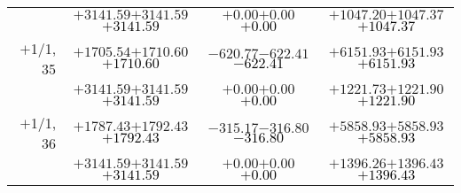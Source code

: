 \documentclass[compress]{beamer}
\begin{document}
\begin{frame}
{\begin{tabular}{r | c | c | c}
           & $+3141.59$\hspace{0.1 cm}$+3141.59$\hspace{0.1 cm}\textcolor{black}{$+3141.59$} & $+0.00$\hspace{0.1 cm}$+0.00$\hspace{0.1 cm}\textcolor{black}{$+0.00$} & $+1047.20$\hspace{0.1 cm}$+1047.37$\hspace{0.1 cm}\textcolor{black}{$+1047.37$} \\
$+$1/1, 35 & $+1705.54$\hspace{0.1 cm}$+1710.60$\hspace{0.1 cm}\textcolor{black}{$+1710.60$} & $-620.77$\hspace{0.1 cm}$-622.41$\hspace{0.1 cm}\textcolor{black}{$-622.41$} & $+6151.93$\hspace{0.1 cm}$+6151.93$\hspace{0.1 cm}\textcolor{black}{$+6151.93$} \\
           & $+3141.59$\hspace{0.1 cm}$+3141.59$\hspace{0.1 cm}\textcolor{black}{$+3141.59$} & $+0.00$\hspace{0.1 cm}$+0.00$\hspace{0.1 cm}\textcolor{black}{$+0.00$} & $+1221.73$\hspace{0.1 cm}$+1221.90$\hspace{0.1 cm}\textcolor{black}{$+1221.90$} \\
$+$1/1, 36 & $+1787.43$\hspace{0.1 cm}$+1792.43$\hspace{0.1 cm}\textcolor{black}{$+1792.43$} & $-315.17$\hspace{0.1 cm}$-316.80$\hspace{0.1 cm}\textcolor{black}{$-316.80$} & $+5858.93$\hspace{0.1 cm}$+5858.93$\hspace{0.1 cm}\textcolor{black}{$+5858.93$} \\
           & $+3141.59$\hspace{0.1 cm}$+3141.59$\hspace{0.1 cm}\textcolor{black}{$+3141.59$} & $+0.00$\hspace{0.1 cm}$+0.00$\hspace{0.1 cm}\textcolor{black}{$+0.00$} & $+1396.26$\hspace{0.1 cm}$+1396.43$\hspace{0.1 cm}\textcolor{black}{$+1396.43$} \\
\end{tabular}}
\end{frame}
\end{document}

